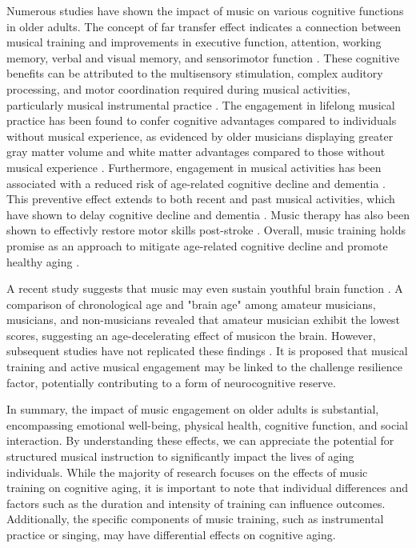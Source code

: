 Numerous studies have shown the impact of music on various cognitive functions in older adults. The concept of far transfer effect indicates a connection between musical training and improvements in executive function, attention, working memory, verbal and visual memory, and sensorimotor function \cite{Bugos2007, Dege2018, Hanna-Pladdy2011}. 
These cognitive benefits can be attributed to the multisensory stimulation, complex auditory processing, and motor coordination required during musical activities, particularly musical instrumental practice \cite{Seinfeld2013}. The engagement in lifelong musical practice has been found to confer cognitive advantages compared to individuals without musical experience, as evidenced by older musicians displaying greater gray matter volume and white matter advantages compared to those without musical experience \cite{James2014}. Furthermore, engagement in musical activities has been associated with a reduced risk of age-related cognitive decline and dementia \cite{Balbag2014}. This preventive effect extends to both recent and past musical activities, which have shown to delay cognitive decline and dementia \cite{Hanna-Pladdy2011, Hanna-Pladdy2012}. Music therapy has also been shown to effectivly restore motor skills post-stroke \cite{Grau-Sanchez2020, Altenmuller2020}. Overall, music training holds promise as an approach to mitigate age-related cognitive decline and promote healthy aging \cite{Klimova2017}.

A recent study suggests that music may even sustain youthful brain function \cite{Rogenmoser2018}. A comparison of chronological age and  "brain age" among amateur musicians, musicians, and non-musicians revealed that amateur musician exhibit the lowest scores, suggesting an age-decelerating effect of musicon the brain. However, subsequent studies have not replicated these findings \cite{Matziorinis2023}. It is proposed that musical training and active musical engagement may be linked to the challenge resilience factor, potentially contributing to a form of neurocognitive reserve.

In summary, the impact of music engagement on older adults is substantial, encompassing emotional well-being, physical health, cognitive function, and social interaction. By understanding these effects, we can appreciate the potential for structured musical instruction to significantly impact the lives of aging individuals. While the majority of research focuses on the effects of music training on cognitive aging, it is important to note that individual differences and factors such as the duration and intensity of training can influence outcomes. Additionally, the specific components of music training, such as instrumental practice or singing, may have differential effects on cognitive aging.



